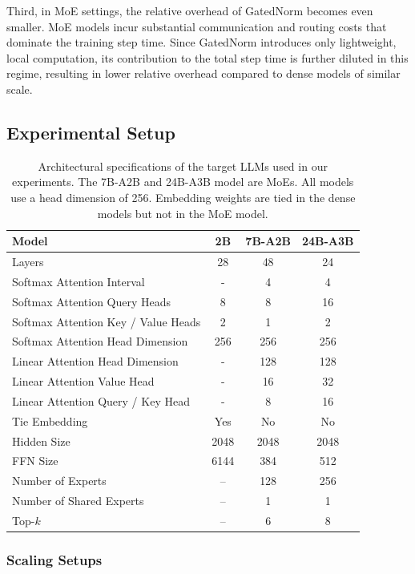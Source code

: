 \documentclass{article} %
\begin{document}
Third, in MoE settings, the relative overhead of GatedNorm becomes even smaller. 
MoE models incur substantial communication and routing costs that dominate the training step time. 
Since GatedNorm introduces only lightweight, local computation, its contribution to the total step time is further diluted in this regime, resulting in lower relative overhead compared to dense models of similar scale.

\subsection{Experimental Setup}
\label{sec:detailed_setup}

\begin{table}[h]
\centering
\caption{Architectural specifications of the target LLMs used in our experiments. The 7B-A2B and 24B-A3B model are MoEs. All models use a head dimension of 256. Embedding weights are tied in the dense models but not in the MoE model.}
\label{tab:architectures}
\begin{tabular}{lccc}
\toprule
\textbf{Model} & \textbf{2B} & \textbf{7B-A2B} & \textbf{24B-A3B} \\
\midrule
Layers & 28 & 48 & 24 \\
Softmax Attention Interval & - & 4 & 4 \\
Softmax Attention Query Heads & 8 & 8 & 16 \\
Softmax Attention Key / Value Heads & 2 & 1 & 2 \\
Softmax Attention Head Dimension & 256 & 256 & 256 \\
Linear Attention Head Dimension & - & 128 & 128 \\
Linear Attention Value Head & - & 16 & 32 \\
Linear Attention Query / Key Head & - & 8 & 16 \\
Tie Embedding & Yes & No & No \\
Hidden Size & 2048 & 2048 & 2048 \\
FFN Size & 6144 & 384 & 512 \\
Number of Experts & -- & 128 & 256 \\
Number of Shared Experts & -- & 1 & 1 \\
Top-$k$ & -- & 6 & 8 \\
\bottomrule
\end{tabular}
\end{table}


\subsubsection{Scaling Setups}
\label{app:scaling_set}
\end{document}
